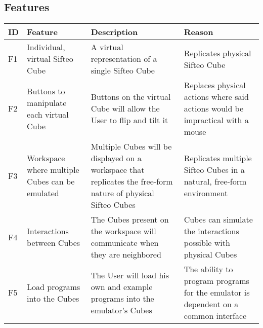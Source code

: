 \documentclass[12pt]{article}
\begin{document}
\appendix
    \begin{landscape}
    \section{Features}
    \begin{table}[h!]
      \begin{tabular}{p{.25in} | p{2.75in} | p{3in} | p{3in}}
        \textbf{ID} &
        \textbf{Feature} &
        \textbf{Description} &
        \textbf{Reason} 
        \\ \hline

        F1 &
        Individual, virtual Sifteo Cube &
        A virtual representation of a single Sifteo Cube &
        Replicates physical Sifteo Cube
        \\ \hline

        F2 &
        Buttons to manipulate each virtual Cube &
        Buttons on the virtual Cube will allow the User to flip and tilt it &
        Replaces physical actions where said actions would be impractical with a mouse
        \\ \hline

        F3 &
        Workspace where multiple Cubes can be emulated &
        Multiple Cubes will be displayed on a workspace that replicates the free-form nature of physical Sifteo Cubes\index{Sifteo Cubes} &
        Replicates multiple Sifteo Cubes\index{Sifteo Cubes} in a natural, free-form environment
        \\ \hline

        F4 &
        Interactions between Cubes &
        The Cubes present on the workspace will communicate when they are neighbored &
        Cubes can simulate the interactions possible with physical Cubes
        \\ \hline

        F5 &
        Load programs into the Cubes &
        The User will load his own and example programs into the emulator’s\index{emulator} Cubes &
        The ability to program programs for the emulator\index{emulator} is dependent on a common interface
        \\ \hline


\end{tabular}
\end{table}
\end{landscape}
\end{document}

